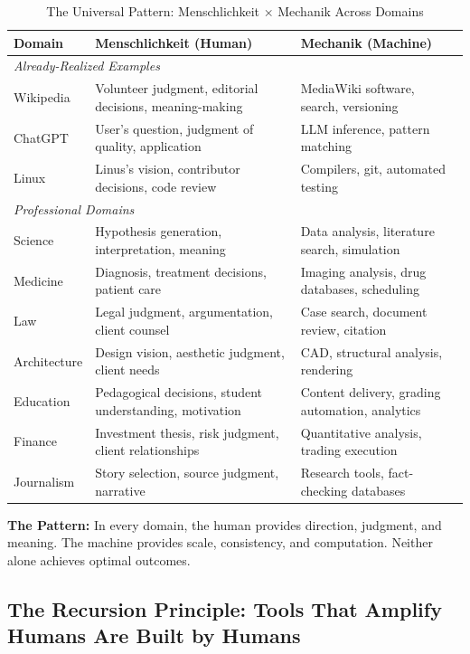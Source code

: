 \begin{table}[htbp]
\centering
\caption{The Universal Pattern: Menschlichkeit × Mechanik Across Domains}
\label{tab:hi-cross-domain}
\renewcommand{\arraystretch}{1.4}
\begin{tabular}{@{}p{2.5cm}p{4.5cm}p{4.5cm}@{}}
\toprule
\textbf{Domain} & \textbf{Menschlichkeit (Human)} & \textbf{Mechanik (Machine)} \\
\midrule
\multicolumn{3}{l}{\textit{Already-Realized Examples}} \\
\midrule
Wikipedia & Volunteer judgment, editorial decisions, meaning-making & MediaWiki software, search, versioning \\
ChatGPT & User's question, judgment of quality, application & LLM inference, pattern matching \\
Linux & Linus's vision, contributor decisions, code review & Compilers, git, automated testing \\
\midrule
\multicolumn{3}{l}{\textit{Professional Domains}} \\
\midrule
Science & Hypothesis generation, interpretation, meaning & Data analysis, literature search, simulation \\
Medicine & Diagnosis, treatment decisions, patient care & Imaging analysis, drug databases, scheduling \\
Law & Legal judgment, argumentation, client counsel & Case search, document review, citation \\
Architecture & Design vision, aesthetic judgment, client needs & CAD, structural analysis, rendering \\
Education & Pedagogical decisions, student understanding, motivation & Content delivery, grading automation, analytics \\
Finance & Investment thesis, risk judgment, client relationships & Quantitative analysis, trading execution \\
Journalism & Story selection, source judgment, narrative & Research tools, fact-checking databases \\
\bottomrule
\end{tabular}
\end{table}

\textbf{The Pattern:} In every domain, the human provides direction, judgment, and meaning. The machine provides scale, consistency, and computation. Neither alone achieves optimal outcomes.

\subsection{The Recursion Principle: Tools That Amplify Humans Are Built by Humans}

